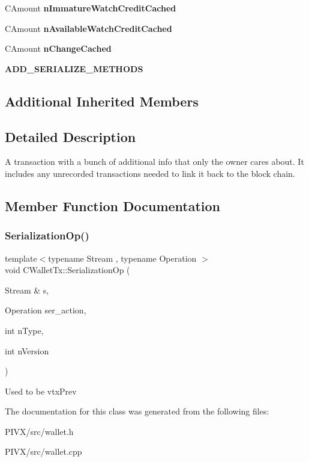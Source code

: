 \begin{DoxyCompactItemize}
\mbox{\label{class_c_wallet_tx_afe7b93d5672df90c6b1d3065dc047fe0}} 
C\+Amount {\bfseries n\+Immature\+Watch\+Credit\+Cached}
\item 
\mbox{\label{class_c_wallet_tx_ab3113c0543c6f68ccbb2449dde29aec7}} 
C\+Amount {\bfseries n\+Available\+Watch\+Credit\+Cached}
\item 
\mbox{\label{class_c_wallet_tx_af324c0c303c44aea9c790e782187343e}} 
C\+Amount {\bfseries n\+Change\+Cached}
\item 
\mbox{\label{class_c_wallet_tx_aad8df774858ddd54f06a76eb075f2823}} 
{\bfseries A\+D\+D\+\_\+\+S\+E\+R\+I\+A\+L\+I\+Z\+E\+\_\+\+M\+E\+T\+H\+O\+DS}
\end{DoxyCompactItemize}
\subsection*{Additional Inherited Members}


\subsection{Detailed Description}
A transaction with a bunch of additional info that only the owner cares about. It includes any unrecorded transactions needed to link it back to the block chain. 

\subsection{Member Function Documentation}
\mbox{\label{class_c_wallet_tx_a94e65d0105f2a75a627e374b0bbefe06}} 
\subsubsection{\texorpdfstring{Serialization\+Op()}{SerializationOp()}}
{\footnotesize\ttfamily template$<$typename Stream , typename Operation $>$ \\
void C\+Wallet\+Tx\+::\+Serialization\+Op (\begin{DoxyParamCaption}\item[{Stream \&}]{s,  }\item[{Operation}]{ser\+\_\+action,  }\item[{int}]{n\+Type,  }\item[{int}]{n\+Version }\end{DoxyParamCaption})\hspace{0.3cm}{\ttfamily [inline]}}

Used to be vtx\+Prev 

The documentation for this class was generated from the following files\+:\begin{DoxyCompactItemize}
\item 
P\+I\+V\+X/src/wallet.\+h\item 
P\+I\+V\+X/src/wallet.\+cpp\end{DoxyCompactItemize}
